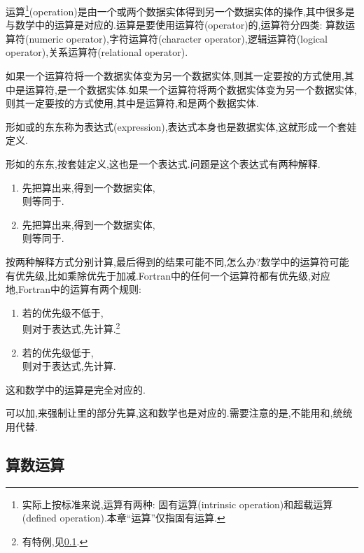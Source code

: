 运算\footnote{
    实际上按标准来说,运算有两种: 固有运算(intrinsic operation)和超载运算(defined operation).本章``运算''仅指固有运算.
}(operation)是由一个或两个数据实体得到另一个数据实体的操作,其中很多是与数学中的运算是对应的.运算是要使用运算符(operator)的,运算符分四类: 算数运算符(numeric operator),字符运算符(character operator),逻辑运算符(logical operator),关系运算符(relational operator).

如果一个运算符将一个数据实体变为另一个数据实体,则其一定要按\ttt{[op][q]}的方式使用,其中\ttt{[op]}是运算符,\ttt{[q]}是一个数据实体.如果一个运算符将两个数据实体变为另一个数据实体,则其一定要按\ttt{[q1][op][q2]}的方式使用,其中\ttt{[op]}是运算符,\ttt{[q1]}和\ttt{[q2]}是两个数据实体.

形如\ttt{[op][q]}或\ttt{[q1][op][q2]}的东东称为表达式(expression),表达式本身也是数据实体,这就形成一个套娃定义.

形如\ttt{[q1][op12][q2][op23][q3]}的东东,按套娃定义,这也是一个表达式.问题是这个表达式有两种解释.
\begin{enumerate}
    \item 先把\ttt{[q1][op12][q2]}算出来,得到一个数据实体\ttt{[q12]},\\则\ttt{[q1][op12][q2][op23][q3]}等同于\ttt{[q12][op23][q3]}.
    \item 先把\ttt{[q2][op23][q3]}算出来,得到一个数据实体\ttt{[q23]},\\则\ttt{[q1][op12][q2][op23][q3]}等同于\ttt{[q1][op12][q23]}.
\end{enumerate}
按两种解释方式分别计算,最后得到的结果可能不同,怎么办?数学中的运算符可能有优先级,比如乘除优先于加减.Fortran中的任何一个运算符都有优先级,对应地,Fortran中的运算有两个规则:
\begin{enumerate}
    \item 若\ttt{[op12]}的优先级不低于\ttt{[op23]},\\则对于表达式\ttt{[q1][op12][q2][op23][q3]},先计算\ttt{[q1][op12][q2]}.\footnote{
        有特例,见\ref{fortran_numeric_operator}.
    }
    \item 若\ttt{[op12]}的优先级低于\ttt{[op23]},\\则对于表达式\ttt{[q1][op12][q2][op23][q3]},先计算\ttt{[q2][op23][q3]}.
\end{enumerate}
这和数学中的运算是完全对应的.

可以加\ttt{()},来强制让\ttt{()}里的部分先算,这和数学也是对应的.需要注意的是,不能用\ttt{[]}和\ttt{{}},统统用\ttt{()}代替.

\subsection{算数运算}\label{fortran_numeric_operator}

